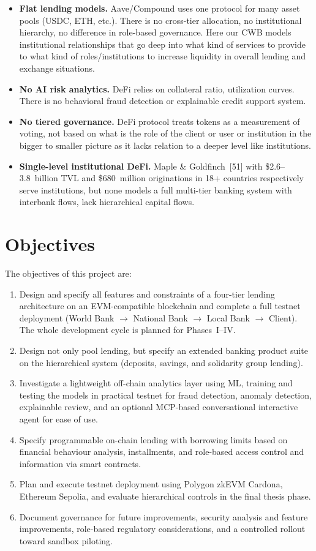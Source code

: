 \documentclass[12pt, a4paper]{report}
\begin{document}
\begin{itemize}[noitemsep]
\item \textbf{Flat lending models.} Aave/Compound uses one protocol for many asset pools (USDC, ETH, etc.). There is no cross-tier allocation, no institutional hierarchy, no difference in role-based governance. Here our CWB models institutional relationships that go deep into what kind of services to provide to what kind of roles/institutions to increase liquidity in overall lending and exchange situations.
\item \textbf{No AI risk analytics.} DeFi relies on collateral ratio, utilization curves. There is no behavioral fraud detection or explainable credit support system.
\item \textbf{No tiered governance.} DeFi protocol treats tokens as a measurement of voting, not based on what is the role of the client or user or institution in the bigger to smaller picture as it lacks relation to a deeper level like institutions.
\item \textbf{Single-level institutional DeFi.} Maple \& Goldfinch~[51] with \$2.6--3.8~billion TVL and \$680~million originations in 18+ countries respectively serve institutions, but none models a full multi-tier banking system with interbank flows, lack hierarchical capital flows.
\end{itemize}

\section{Objectives}

The objectives of this project are:

\begin{enumerate}[noitemsep]
\item Design and specify all features and constraints of a four-tier lending architecture on an EVM-compatible blockchain and complete a full testnet deployment (World Bank $\to$ National Bank $\to$ Local Bank $\to$ Client). The whole development cycle is planned for Phases~I--IV.
\item Design not only pool lending, but specify an extended banking product suite on the hierarchical system (deposits, savings, and solidarity group lending).
\item Investigate a lightweight off-chain analytics layer using ML, training and testing the models in practical testnet for fraud detection, anomaly detection, explainable review, and an optional MCP-based conversational interactive agent for ease of use.
\item Specify programmable on-chain lending with borrowing limits based on financial behaviour analysis, installments, and role-based access control and information via smart contracts.
\item Plan and execute testnet deployment using Polygon zkEVM Cardona, Ethereum Sepolia, and evaluate hierarchical controls in the final thesis phase.
\item Document governance for future improvements, security analysis and feature improvements, role-based regulatory considerations, and a controlled rollout toward sandbox piloting.
\end{enumerate}
\end{document}

